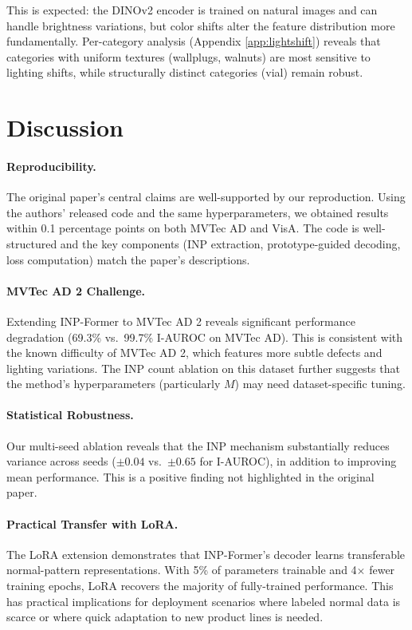 \documentclass[10pt]{article} %
\begin{document}
This is expected: the DINOv2 encoder is trained on natural images and can handle brightness variations, but color shifts alter the feature distribution more fundamentally. Per-category analysis (Appendix \ref{app:lightshift}) reveals that categories with uniform textures (wallplugs, walnuts) are most sensitive to lighting shifts, while structurally distinct categories (vial) remain robust.


\section{Discussion}
\label{sec:discussion}

\paragraph{Reproducibility.} The original paper's central claims are well-supported by our reproduction. Using the authors' released code and the same hyperparameters, we obtained results within 0.1 percentage points on both MVTec AD and VisA. The code is well-structured and the key components (INP extraction, prototype-guided decoding, loss computation) match the paper's descriptions.

\paragraph{MVTec AD 2 Challenge.} Extending INP-Former to MVTec AD 2 reveals significant performance degradation (69.3\% vs.\ 99.7\% I-AUROC on MVTec AD). This is consistent with the known difficulty of MVTec AD 2, which features more subtle defects and lighting variations. The INP count ablation on this dataset further suggests that the method's hyperparameters (particularly $M$) may need dataset-specific tuning.

\paragraph{Statistical Robustness.} Our multi-seed ablation reveals that the INP mechanism substantially reduces variance across seeds ($\pm 0.04$ vs.\ $\pm 0.65$ for I-AUROC), in addition to improving mean performance. This is a positive finding not highlighted in the original paper.

\paragraph{Practical Transfer with LoRA.} The LoRA extension demonstrates that INP-Former's decoder learns transferable normal-pattern representations. With 5\% of parameters trainable and 4$\times$ fewer training epochs, LoRA recovers the majority of fully-trained performance. This has practical implications for deployment scenarios where labeled normal data is scarce or where quick adaptation to new product lines is needed.
\end{document}
